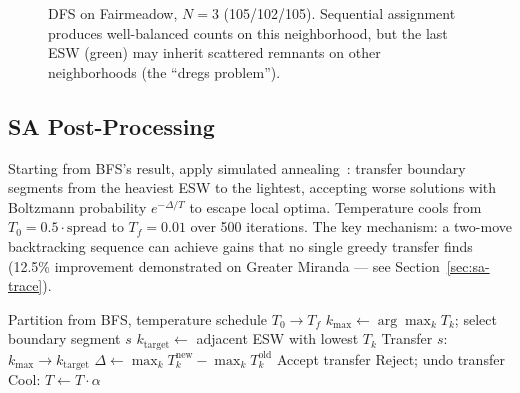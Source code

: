\documentclass[conference]{IEEEtran}
\begin{document}
\begin{figure}[htbp]
\centering
{}
\caption{DFS on Fairmeadow, $N=3$ (105/102/105). Sequential assignment produces well-balanced counts on this neighborhood, but the last ESW (green) may inherit scattered remnants on other neighborhoods (the ``dregs problem'').}
\end{figure}

\subsection{SA Post-Processing}

Starting from BFS's result, apply simulated annealing~\cite{kirkpatrick1983}: transfer boundary segments from the heaviest ESW to the lightest, accepting worse solutions with Boltzmann probability $e^{-\Delta/T}$ to escape local optima. Temperature cools from $T_0 = 0.5 \cdot \text{spread}$ to $T_f = 0.01$ over 500 iterations. The key mechanism: a two-move backtracking sequence can achieve gains that no single greedy transfer finds (12.5\% improvement demonstrated on Greater Miranda --- see Section~\ref{sec:sa-trace}).

\begin{algorithm}[htbp]
\caption{SA Post-Processing}
\begin{algorithmic}[1]
\REQUIRE Partition from BFS, temperature schedule $T_0 \to T_f$
    \STATE $k_{\max} \leftarrow \arg\max_k T_k$; select boundary segment $s$
    \STATE $k_{\text{target}} \leftarrow$ adjacent ESW with lowest $T_k$
    \STATE Transfer $s$: $k_{\max} \to k_{\text{target}}$
    \STATE $\Delta \leftarrow \max_k T_k^{\text{new}} - \max_k T_k^{\text{old}}$
        \STATE Accept transfer
    \ELSE
        \STATE Reject; undo transfer
    \ENDIF
    \STATE Cool: $T \leftarrow T \cdot \alpha$
\ENDFOR
\end{algorithmic}
\end{algorithm}
\end{document}
